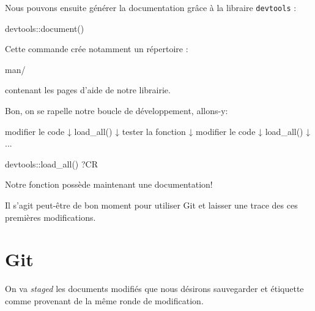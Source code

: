 \documentclass[
  letterpaper,
  DIV=11,
  numbers=noendperiod]{scrreprt}
\newenvironment{Shaded}{\begin{snugshade}}{\end{snugshade}}
\newcommand{\FunctionTok}[1]{\textcolor[rgb]{0.28,0.35,0.67}{#1}}
\newcommand{\NormalTok}[1]{\textcolor[rgb]{0.00,0.23,0.31}{#1}}
\newcommand{\SpecialCharTok}[1]{\textcolor[rgb]{0.37,0.37,0.37}{#1}}
\begin{document}
Nous pouvons ensuite générer la documentation grâce à la libraire
\texttt{devtools} :

\begin{Shaded}
\begin{Highlighting}[]
\NormalTok{devtools}\SpecialCharTok{::}\FunctionTok{document}\NormalTok{()}
\end{Highlighting}
\end{Shaded}

Cette commande crée notamment un répertoire :

\begin{Shaded}
\begin{Highlighting}[]
\NormalTok{man/}
\end{Highlighting}
\end{Shaded}

contenant les pages d'aide de notre librairie.

Bon, on se rapelle notre boucle de développement, allons-y:

\begin{Shaded}
\begin{Highlighting}[]
\NormalTok{modifier le code}
\NormalTok{       ↓}
\NormalTok{   load\_all()}
\NormalTok{       ↓}
\NormalTok{tester la fonction}
\NormalTok{       ↓}
\NormalTok{modifier le code}
\NormalTok{       ↓}
\NormalTok{   load\_all()}
\NormalTok{       ↓}
\NormalTok{      ...}
\end{Highlighting}
\end{Shaded}

\begin{Shaded}
\begin{Highlighting}[]
\NormalTok{devtools}\SpecialCharTok{::}\FunctionTok{load\_all}\NormalTok{()}
\NormalTok{?CR}
\end{Highlighting}
\end{Shaded}

Notre fonction possède maintenant une documentation!

Il s'agit peut-être de bon moment pour utiliser Git et laisser une trace
des ces premières modifications.

\section*{Git}\label{git}


On va \emph{staged} les documents modifiés que nous désirons sauvegarder
et étiquette comme provenant de la même ronde de modification.
\end{document}
